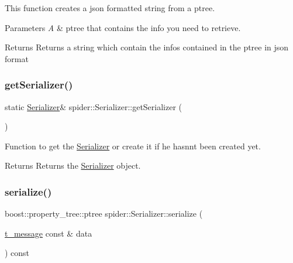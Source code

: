 This function creates a json formatted string from a ptree. 


\begin{DoxyParams}{Parameters}
{\em A} & ptree that contains the info you need to retrieve. \\
\hline
\end{DoxyParams}
\begin{DoxyReturn}{Returns}
Returns a string which contain the infos contained in the ptree in json format 
\end{DoxyReturn}
\mbox{\label{classspider_1_1_serializer_aaadf4a402a583583667757408d60d4d7}} 
\subsubsection{\texorpdfstring{get\+Serializer()}{getSerializer()}}
{\footnotesize\ttfamily static \hyperlink{classspider_1_1_serializer}{Serializer}\& spider\+::\+Serializer\+::get\+Serializer (\begin{DoxyParamCaption}{ }\end{DoxyParamCaption})\hspace{0.3cm}{\ttfamily [static]}}



Function to get the \hyperlink{classspider_1_1_serializer}{Serializer} or create it if he hasnn\textquotesingle{}t been created yet. 

\begin{DoxyReturn}{Returns}
Returns the \hyperlink{classspider_1_1_serializer}{Serializer} object. 
\end{DoxyReturn}
\mbox{\label{classspider_1_1_serializer_ad8cbce40137efc7be3cb679a883800f8}} 
\subsubsection{\texorpdfstring{serialize()}{serialize()}\hspace{0.1cm}{\footnotesize\ttfamily [1/4]}}
{\footnotesize\ttfamily boost\+::property\+\_\+tree\+::ptree spider\+::\+Serializer\+::serialize (\begin{DoxyParamCaption}\item[{\hyperlink{structt__message}{t\+\_\+message} const \&}]{data }\end{DoxyParamCaption}) const}




